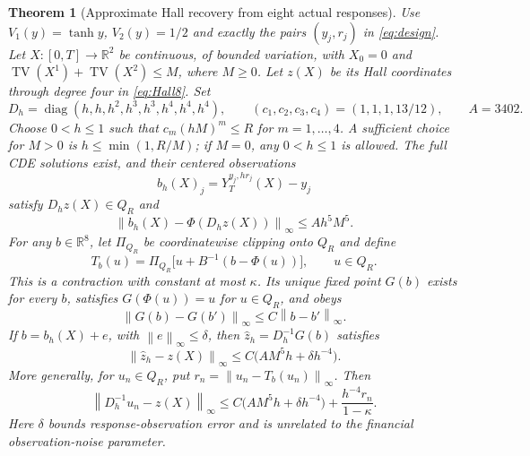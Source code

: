 \documentclass[11pt,a4paper]{article}
\numberwithin{equation}{section}
\newtheorem{theorem}{Theorem}[section]
\theoremstyle{definition}
\theoremstyle{remark}
\DeclareMathOperator{\diag}{diag}
\newcommand{\R}{\mathbb R}
\newcommand{\norm}[1]{\left\lVert #1\right\rVert}
\begin{document}
\begin{theorem}[Approximate Hall recovery from eight actual responses]
\label{thm:actual}
Use $V_1(y)=\tanh y$, $V_2(y)=1/2$ and exactly the pairs
$(y_j,r_j)$ in \eqref{eq:design}. Let $X:[0,T]\to\R^2$ be continuous,
of bounded variation, with $X_0=0$ and
$\operatorname{TV}(X^1)+\operatorname{TV}(X^2)\leq M$, where $M\geq0$.
Let $z(X)$ be its Hall coordinates through degree four in
\eqref{eq:Hall8}. Set
\[
 D_h=\diag(h,h,h^2,h^3,h^3,h^4,h^4,h^4),\qquad
 (c_1,c_2,c_3,c_4)=(1,1,1,13/12),\qquad A=3402.
\]
Choose $0<h\leq1$ such that $c_m(hM)^m\leq R$ for $m=1,\ldots,4$.
A sufficient choice for $M>0$ is $h\leq\min(1,R/M)$; if $M=0$, any
$0<h\leq1$ is allowed. The full CDE solutions exist, and their centered
observations
\[
 b_h(X)_j=Y_T^{y_j,hr_j}(X)-y_j
\]
satisfy $D_hz(X)\in Q_R$ and
\begin{equation}\label{eq:actualremainder}
 \norm{b_h(X)-\Phi(D_hz(X))}_\infty\leq Ah^5M^5.
\end{equation}
For any $b\in\R^8$, let $\Pi_{Q_R}$ be coordinatewise clipping onto $Q_R$
and define
\begin{equation}\label{eq:clippeddecoder}
 T_b(u)=\Pi_{Q_R}\bigl[u+B^{-1}(b-\Phi(u))\bigr],\qquad u\in Q_R.
\end{equation}
This is a contraction with constant at most $\kappa$. Its unique fixed
point $G(b)$ exists for every $b$, satisfies $G(\Phi(u))=u$ for $u\in Q_R$,
and obeys
\[
 \norm{G(b)-G(b')}_\infty\leq C\norm{b-b'}_\infty.
\]
If $b=b_h(X)+e$, with $\norm e_\infty\leq\delta$, then
$\widehat z_h=D_h^{-1}G(b)$ satisfies
\begin{equation}\label{eq:actualerror}
 \norm{\widehat z_h-z(X)}_\infty
 \leq C\bigl(AM^5h+\delta h^{-4}\bigr).
\end{equation}
More generally, for $u_n\in Q_R$, put
$r_n=\norm{u_n-T_b(u_n)}_\infty$. Then
\begin{equation}\label{eq:iterationerror}
 \norm{D_h^{-1}u_n-z(X)}_\infty
 \leq C\bigl(AM^5h+\delta h^{-4}\bigr)
       +\frac{h^{-4}r_n}{1-\kappa}.
\end{equation}
Here $\delta$ bounds response-observation error and is unrelated to the
financial observation-noise parameter.
\end{theorem}
\end{document}
